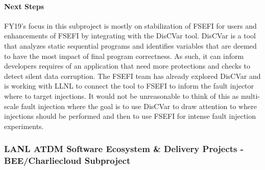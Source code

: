 
\paragraph{Next Steps}
FY19's focus in this subproject is mostly on stabilization of FSEFI for users
and enhancements of FSEFI by integrating with the
DisCVar\cite{DBLP:conf/ppopp/MenonM18} tool.  DisCVar is a tool that analyzes
static sequential programs and identifies variables that are deemed to have the
most impact of final program correctness.  As such, it can inform developers
requires of an application that need more protections and checks to detect
silent data corruption.  The FSEFI team has already explored DisCVar and is
working with LLNL to connect the tool to FSEFI to inform the fault injector
where to target injections.  It would not be unreasonable to think of this as
multi-scale fault injection where the goal is to use DisCVar to draw attention
to where injections should be performed and then to use FSEFI for intense fault
injection experiments.

\subsubsection{LANL ATDM Software Ecosystem \& Delivery Projects - BEE/Charliecloud Subproject} 


